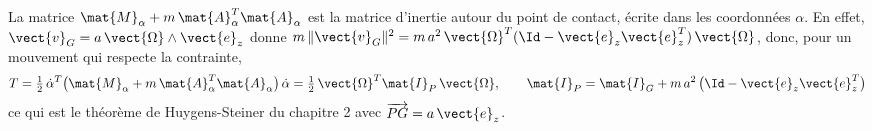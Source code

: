 La matrice $\mat{M}_\alpha + m\,\mat{A}_\alpha^T\mat{A}_\alpha$ est la
matrice d'inertie autour du point de contact, écrite dans les
coordonnées $\alpha$. En effet, $\vect{v}_G = a\,\vect{\Omega}\wedge
\vect{e}_z$ donne $m\,\|\vect{v}_G\|^2 = m\,a^2\,\vect{\Omega}^T
(\Id - \vect{e}_z\vect{e}_z^T)\,\vect{\Omega}$, donc, pour un mouvement
qui respecte la contrainte,
\[
    T = \tfrac12\,\dot\alpha^T\bigl(\mat{M}_\alpha
    + m\,\mat{A}_\alpha^T\mat{A}_\alpha\bigr)\,\dot\alpha
    = \tfrac12\,\vect{\Omega}^T\mat{I}_P\,\vect{\Omega},
    \qquad
    \mat{I}_P = \mat{I}_G
    + m\,a^2\,\bigl(\Id - \vect{e}_z\vect{e}_z^T\bigr)
\]
ce qui est le théorème de Huygens-Steiner du chapitre 2 avec
$\overrightarrow{PG} = a\,\vect{e}_z$.

